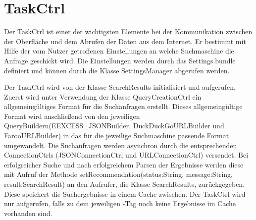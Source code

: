 
\section{TaskCtrl}

Der TaskCtrl ist einer der wichtigsten Elemente bei der Kommunikation zwischen der Oberfläche und dem Abrufen der Daten aus dem Internet. Er bestimmt mit Hilfe der vom Nutzer getroffenen Einstellungen an welche Suchmaschine die Anfrage geschickt wird. Die Einstellungen werden durch das \glqq Settings.bundle\grqq\xspace definiert und können durch die Klasse \glqq SettingsManager\grqq\xspace abgerufen werden. 

Der TaskCtrl wird von der Klasse \glqq SearchResults\grqq\xspace initialisiert und aufgerufen. Zuerst wird unter Verwendung der Klasse \glqq QueryCreationCtrl \grqq\xspace ein allgemeingültiges Format für die Suchanfragen erstellt. Dieses allgemeingültige Format wird anschließend von den jeweiligen \glqq QueryBuildern\grqq\xspace (EEXCESS\_JSONBuilder, DuckDuckGoURLBuilder und FarooURLBuilder) in das für die jeweilige Suchmaschine passende Format umgewandelt. Die Suchanfragen werden asynchron durch die entsprechenden \glqq ConnectionCtrls \grqq\xspace (JSONConnectionCtrl und URLConnectionCtrl) versendet. Bei erfolgreicher Suche und nach erfolgreichem Parsen der Ergebnisse werden diese mit Aufruf der Methode \glqq setRecommendation(status:String, message:String, result:SearchResult) \grqq\xspace an den Aufrufer, die Klasse SearchResults, zurückgegeben. Diese speichert die Suchergebnisse in einem Cache zwischen. Der TaskCtrl wird nur aufgerufen, falls zu dem jeweiligen \SEARCH-Tag noch keine Ergebnisse im Cache vorhanden sind. 

